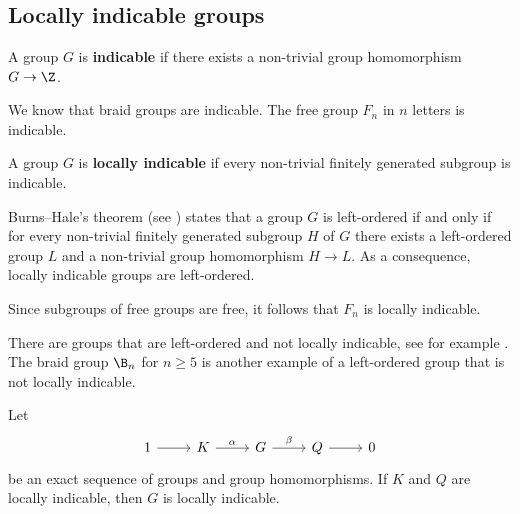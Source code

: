 \section{}

\subsection{Locally indicable groups}

\begin{definition}
    A group $G$ is \textbf{indicable} if
    there exists a non-trivial group homomorphism $G\to\Z$.
\end{definition}

We know that braid groups are indicable.
The free group $F_n$ in $n$ letters is indicable. 

\begin{definition}
    A group $G$ is \textbf{locally indicable} if every 
    non-trivial finitely generated subgroup is indicable.
\end{definition}

Burns--Hale's theorem (see \cite[Theorem 1.50]{MR3560661}) states that a group $G$ is left-ordered if and only if
for every non-trivial finitely generated subgroup $H$ of $G$ there exists 
a left-ordered group $L$ and a non-trivial group homomorphism $H\to L$. As a consequence, 
locally indicable groups are left-ordered. 

\begin{example}
    Since subgroups of free groups are free, 
    it follows that $F_n$ is locally indicable. 
\end{example}

There are groups that are left-ordered and not locally indicable, see
for example \cite{MR1084707}. The braid group
$\B_n$ for $n\geq5$ is another example of a left-ordered group that is not locally indicable.

\begin{proposition}
\label{pro:LI_exact}
    Let
    \[\begin{tikzcd}
	1 & K & G & Q & 0
	\arrow[from=1-1, to=1-2]
	\arrow["\alpha", from=1-2, to=1-3]
	\arrow["\beta", from=1-3, to=1-4]
	\arrow[from=1-4, to=1-5]
\end{tikzcd}
\]
    be an exact sequence of groups and group homomorphisms. 
    If $K$ and $Q$ are
    locally indicable, then $G$ is locally indicable.
\end{proposition}

